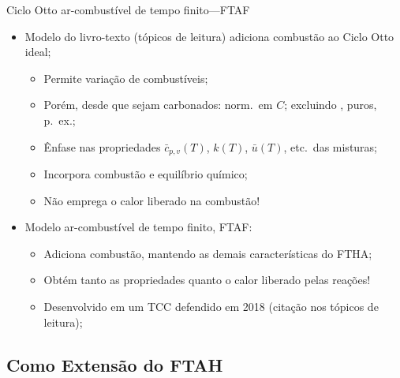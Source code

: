     \begin{frame}{Ciclo Otto ar-combustível de tempo finito---FTAF}\vspace*{-2em}
        \begin{itemize}
            \item<1->  Modelo do livro-texto (tópicos de leitura) adiciona combustão ao
                \alert{Ciclo Otto ideal};
            \begin{itemize}
                \item<2->  Permite variação de \alert{combustíveis};
                \item<3->  Porém, desde que sejam \alert{carbonados}: norm.~em $C$; excluindo
                    ,  puros, p.~ex.;
                \item<3->  Ênfase nas \alert{propriedades} $\bar{c}_{p,v}(T)$, $k(T)$,
                    $\bar{u}(T)$, etc.~das misturas;
                \item<4->  Incorpora \alert{combustão} e \alert{equilíbrio químico};
                \item<5->  \alert{Não emprega} o calor liberado na \alert{combustão}!
            \end{itemize}
            \item<6->  Modelo \alert{ar-combustível de tempo finito, FTAF}:
            \begin{itemize}
                \item<7->  Adiciona \alert{combustão}, mantendo as demais características do
                    \alert{FTHA};
                \item<8->  Obtém tanto as \alert{propriedades} quanto o \alert{calor liberado}
                    pelas \alert{reações}!
                \item<9->  Desenvolvido em um \alert{TCC} defendido em \alert{2018} (citação nos
                    tópicos de leitura);
            \end{itemize}
        \end{itemize}
    \end{frame}

\subsection{Como Extensão do FTAH}

